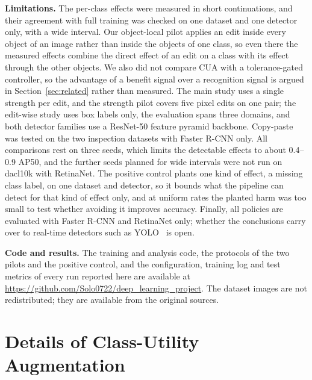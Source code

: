 \documentclass[conference]{IEEEtran}
\begin{document}
\noindent\textbf{Limitations.} The per-class effects were measured in short continuations, and their agreement with full training was checked on one dataset and one detector only, with a wide interval. Our object-local pilot applies an edit inside every object of an image rather than inside the objects of one class, so even there the measured effects combine the direct effect of an edit on a class with its effect through the other objects. We also did not compare CUA with a tolerance-gated controller, so the advantage of a benefit signal over a recognition signal is argued in Section~\ref{sec:related} rather than measured. The main study uses a single strength per edit, and the strength pilot covers five pixel edits on one pair; the edit-wise study uses box labels only, the evaluation spans three domains, and both detector families use a ResNet-50 feature pyramid backbone. Copy-paste was tested on the two inspection datasets with Faster R-CNN only. All comparisons rest on three seeds, which limits the detectable effects to about 0.4--0.9 AP50, and the further seeds planned for wide intervals were not run on dacl10k with RetinaNet. The positive control plants one kind of effect, a missing class label, on one dataset and detector, so it bounds what the pipeline can detect for that kind of effect only, and at uniform rates the planted harm was too small to test whether avoiding it improves accuracy. Finally, all policies are evaluated with Faster R-CNN and RetinaNet only; whether the conclusions carry over to real-time detectors such as YOLO~\cite{bochkovskiy2020yolov4} is open.

\noindent\textbf{Code and results.} The training and analysis code, the protocols of the two pilots and the positive control, and the configuration, training log and test metrics of every run reported here are available at \url{https://github.com/Solo0722/deep_learning_project}. The dataset images are not redistributed; they are available from the original sources.

\appendices

\section{Details of Class-Utility Augmentation}
\label{app:cua}
\end{document}
